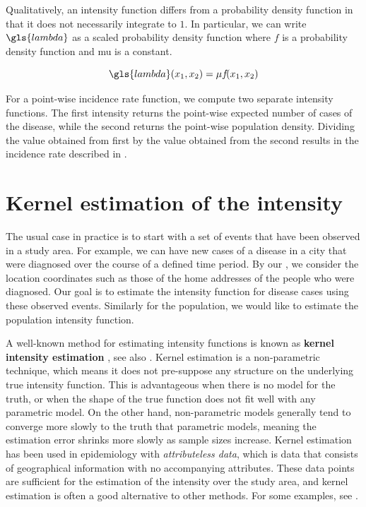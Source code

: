 Qualitatively,
an intensity function differs from a probability density function in that it does not necessarily integrate to $1$.
In particular, we can write $\gls{lambda}$ as a scaled probability density function
where $f$ is a probability density function and \gls{mu} is a constant.

\begin{equation}
    \label{eq:lambda_mu}
    \gls{lambda}\xvec = \mu f\!\xvec
\end{equation}

For a point-wise \gls{incidence rate} function,
we compute two separate \gls{intensity} functions.
The first \gls{intensity} returns the point-wise expected number of cases of the disease,
while the second returns the point-wise population density.
Dividing the value obtained from first by the value obtained from the second results in the \gls{incidence rate} described in .

\section{Kernel estimation of the intensity}
\label{sec:theory:kernelestimation}

The usual case in practice is to start with a set of \glspl{event} that have been observed in a study area.
For example, we can have new cases of a disease in a city that were diagnosed over the course of a defined time period.
By our ,
we consider the location coordinates such as those of the home addresses of the people who were diagnosed.
Our goal is to estimate the \gls{intensity} function for disease cases using these observed \glspl{event}.
Similarly for the population,
we would like to estimate the population \gls{intensity} function.

A well-known method for estimating \gls{intensity} functions is known as
\textbf{\gls{kernel intensity estimation}} \citep[Section 6.6]{wand1994kernel},
see also \citet{diggle1985kernel}.
Kernel estimation is a non-parametric technique,
which means it does not pre-suppose any structure on the underlying true intensity function.
This is advantageous when there is no model for the truth,
or when the shape of the true function does not fit well with any parametric model.
On the other hand,
non-parametric models generally tend to converge more slowly to the truth that parametric models,
meaning the estimation error shrinks more slowly as sample sizes increase.
Kernel estimation has been used in epidemiology with \textit{attributeless data},
which is data that consists of geographical information with no accompanying attributes.
These data points are sufficient for the estimation of the \gls{intensity} over the study area,
and kernel estimation is often a good alternative to other methods.
For some examples,
see \citet{bithell1990application,portnov2009studying,zusman2012residential}.

